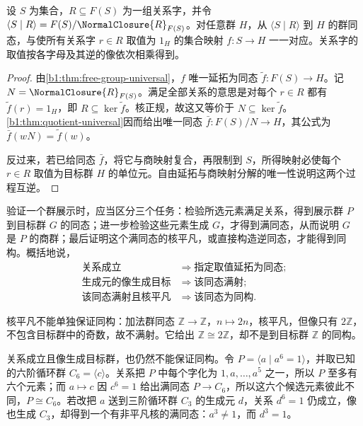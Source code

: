 \begin{proposition}[展示的映射性质]\label{b1:prop:presentation-homomorphism}
	设 \(S\) 为集合，\(R\subseteq F(S)\) 为一组关系字，并令 \(\langle S\mid R\rangle=F(S)/\NormalClosure{R}_{F(S)}\)。对任意群 \(H\)，从 \(\langle S\mid R\rangle\) 到 \(H\) 的群同态，与使所有关系字 \(r\in R\) 取值为 \(1_H\) 的集合映射 \(f:S\to H\) 一一对应。关系字的取值按各字母及其逆的像依次相乘得到。
\end{proposition}
\begin{proof}
	由\cref{b1:thm:free-group-universal}，\(f\) 唯一延拓为同态 \(\widetilde f:F(S)\to H\)。记 \(N=\NormalClosure{R}_{F(S)}\)。满足全部关系的意思是对每个 \(r\in R\) 都有 \(\widetilde f(r)=1_H\)，即 \(R\subseteq\ker\widetilde f\)。核正规，故这又等价于 \(N\subseteq\ker\widetilde f\)。\cref{b1:thm:quotient-universal}因而给出唯一同态 \(\bar f:F(S)/N\to H\)，其公式为 \(\bar f(wN)=\widetilde f(w)\)。

	反过来，若已给同态 \(\bar f\)，将它与商映射复合，再限制到 \(S\)，所得映射必使每个 \(r\in R\) 取值为目标群 \(H\) 的单位元。自由延拓与商映射分解的唯一性说明这两个过程互逆。
\end{proof}

验证一个群展示时，应当区分三个任务：检验所选元素满足关系，得到展示群 \(P\) 到目标群 \(G\) 的同态；进一步检验这些元素生成 \(G\)，才得到满同态，从而说明 \(G\) 是 \(P\) 的商群；最后证明这个满同态的核平凡，或直接构造逆同态，才能得到同构。概括地说，
\[
	\begin{aligned}
		\text{关系成立}&\Longrightarrow\text{指定取值延拓为同态};\\
		\text{生成元的像生成目标}&\Longrightarrow\text{该同态满射};\\
		\text{该同态满射且核平凡}&\Longrightarrow\text{该同态为同构}.
	\end{aligned}
\]

核平凡不能单独保证同构：加法群同态 \(\mathbb Z\to\mathbb Z\)，\(n\mapsto2n\)，核平凡，但像只有 \(2\mathbb Z\)，不包含目标群中的奇数，故不满射。它给出 \(\mathbb Z\cong2\mathbb Z\)，却不是到目标群 \(\mathbb Z\) 的同构。

\ProseParagraphBreak
关系成立且像生成目标群，也仍然不能保证同构。令 \(P=\langle a\mid a^6=1\rangle\)，并取已知的六阶循环群 \(C_6=\langle c\rangle\)。关系把 \(P\) 中每个字化为 \(1,a,\ldots,a^5\) 之一，所以 \(P\) 至多有六个元素；而 \(a\mapsto c\) 因 \(c^6=1\) 给出满同态 \(P\to C_6\)，所以这六个候选元素彼此不同，\(P\cong C_6\)。若改把 \(a\) 送到三阶循环群 \(C_3\) 的生成元 \(d\)，关系 \(d^6=1\) 仍成立，像也生成 \(C_3\)，却得到一个有非平凡核的满同态：\(a^3\ne1\)，而 \(d^3=1\)。

